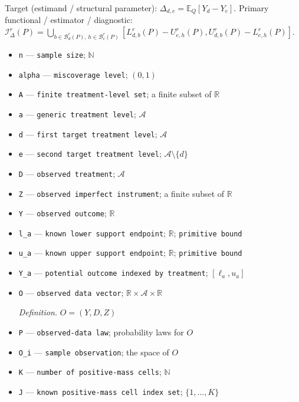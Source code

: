 \documentclass{article}
\begin{document}
Target (estimand / structural parameter): \(\Delta_{d,e}=\mathbb E_Q[Y_d-Y_e]\).
Primary functional / estimator / diagnostic: \(\mathcal I_{\Delta}^r(P)=\bigcup_{b\in\mathcal B_d^r(P),\,h\in\mathcal B_e^r(P)}[L_{d,b}^r(P)-U_{e,h}^r(P),U_{d,b}^r(P)-L_{e,h}^r(P)]\).
\begin{itemize}
  \item \texttt{n} --- \texttt{sample size}; \(\mathbb N\)
  \item \texttt{alpha} --- \texttt{miscoverage level}; \((0,1)\)
  \item \texttt{A} --- \texttt{finite treatment-\allowbreak{}level set}; a finite subset of \(\mathbb R\)
  \item \texttt{a} --- \texttt{generic treatment level}; \(\mathcal A\)
  \item \texttt{d} --- \texttt{first target treatment level}; \(\mathcal A\)
  \item \texttt{e} --- \texttt{second target treatment level}; \(\mathcal A\setminus\{d\}\)
  \item \texttt{D} --- \texttt{observed treatment}; \(\mathcal A\)
  \item \texttt{Z} --- \texttt{observed imperfect instrument}; a finite subset of \(\mathbb R\)
  \item \texttt{Y} --- \texttt{observed outcome}; \(\mathbb R\)
  \item \texttt{l\_\allowbreak{}a} --- \texttt{known lower support endpoint}; \(\mathbb R\); \texttt{primitive bound}
  \item \texttt{u\_\allowbreak{}a} --- \texttt{known upper support endpoint}; \(\mathbb R\); \texttt{primitive bound}
  \item \texttt{Y\_\allowbreak{}a} --- \texttt{potential outcome indexed by treatment}; \([\ell_a,u_a]\)
  \item \texttt{O} --- \texttt{observed data vector}; \(\mathbb R\times\mathcal A\times\mathbb R\)
  \par\smallskip\noindent\emph{Definition.} \(O=(Y,D,Z)\)
  \item \texttt{P} --- \texttt{observed-\allowbreak{}data law}; probability laws for \(O\)
  \item \texttt{O\_\allowbreak{}i} --- \texttt{sample observation}; the space of \(O\)
  \item \texttt{K} --- \texttt{number of positive-\allowbreak{}mass cells}; \(\mathbb N\)
  \item \texttt{J} --- \texttt{known positive-\allowbreak{}mass cell index set}; \(\{1,\ldots,K\}\)

\end{itemize}
\end{document}
